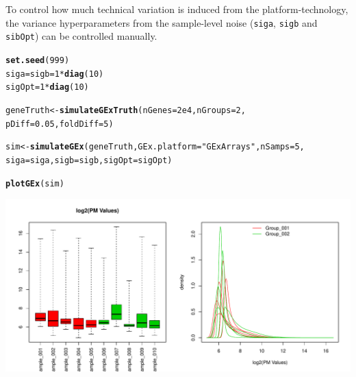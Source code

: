\documentclass{article}\usepackage[]{graphicx}\usepackage[usenames,dvipsnames]{color}
\makeatletter
\def\maxwidth{ %
  \ifdim\Gin@nat@width>\linewidth
    \linewidth
  \else
    \Gin@nat@width
  \fi
}
\newcommand{\hlnum}[1]{\textcolor[rgb]{0.686,0.059,0.569}{#1}}%
\newcommand{\hlstr}[1]{\textcolor[rgb]{0.192,0.494,0.8}{#1}}%
\newcommand{\hlopt}[1]{\textcolor[rgb]{0,0,0}{#1}}%
\newcommand{\hlstd}[1]{\textcolor[rgb]{0.345,0.345,0.345}{#1}}%
\newcommand{\hlkwb}[1]{\textcolor[rgb]{0.69,0.353,0.396}{#1}}%
\newcommand{\hlkwc}[1]{\textcolor[rgb]{0.333,0.667,0.333}{#1}}%
\newcommand{\hlkwd}[1]{\textcolor[rgb]{0.737,0.353,0.396}{\textbf{#1}}}%
\newenvironment{kframe}{%
 \def\at@end@of@kframe{}%
 \ifinner\ifhmode%
  \def\at@end@of@kframe{\end{minipage}}%
  \begin{minipage}{\columnwidth}%
 \fi\fi%
 \def\FrameCommand##1{\hskip\@totalleftmargin \hskip-\fboxsep
 \colorbox{shadecolor}{##1}\hskip-\fboxsep
     \hskip-\linewidth \hskip-\@totalleftmargin \hskip\columnwidth}%
 \MakeFramed {\advance\hsize-\width
   \@totalleftmargin\z@ \linewidth\hsize
   \@setminipage}}%
 {\par\unskip\endMakeFramed%
 \at@end@of@kframe}
\newenvironment{knitrout}{}{} %
\makeatother
\begin{document}
To control how much technical variation is induced from the 
platform-technology, the variance hyperparameters from the sample-level 
noise (\texttt{siga}, \texttt{sigb} and \texttt{sibOpt}) can be 
controlled manually.
\begin{knitrout}
\color{fgcolor}\begin{kframe}
\begin{alltt}
\hlkwd{set.seed}\hlstd{(}\hlnum{999}\hlstd{)}
\hlstd{siga} \hlkwb{=} \hlstd{sigb} \hlkwb{=} \hlnum{1} \hlopt{*} \hlkwd{diag}\hlstd{(}\hlnum{10}\hlstd{)}
\hlstd{sigOpt} \hlkwb{=} \hlnum{1} \hlopt{*} \hlkwd{diag}\hlstd{(}\hlnum{10}\hlstd{)}

\hlstd{geneTruth} \hlkwb{<-} \hlkwd{simulateGExTruth}\hlstd{(}\hlkwc{nGenes} \hlstd{=} \hlnum{2e4}\hlstd{,} \hlkwc{nGroups} \hlstd{=} \hlnum{2}\hlstd{,}
                              \hlkwc{pDiff} \hlstd{=} \hlnum{0.05}\hlstd{,} \hlkwc{foldDiff} \hlstd{=} \hlnum{5}\hlstd{)}
\end{alltt}


{\ttfamily\noindent\itshape\color{messagecolor}{\#\# [quantroSim]: Simulating RNA transcript counts using a Poisson \\\#\#\ \ \ \ \ \ \ \ \ \  distribution with mean parameters from 0.01 to 4662.66}}\begin{alltt}
\hlstd{sim} \hlkwb{<-} \hlkwd{simulateGEx}\hlstd{(geneTruth,}  \hlkwc{GEx.platform} \hlstd{=} \hlstr{"GExArrays"}\hlstd{,} \hlkwc{nSamps} \hlstd{=} \hlnum{5}\hlstd{,}
                   \hlkwc{siga} \hlstd{= siga,} \hlkwc{sigb} \hlstd{= sigb,} \hlkwc{sigOpt} \hlstd{= sigOpt)}
\end{alltt}


{\ttfamily\noindent\itshape\color{messagecolor}{\#\# Simulating gene expression samples using the GEx.platform: GExArrays\\\#\# No PCR amplification of RNA transcript counts.}}\begin{alltt}
\hlkwd{plotGEx}\hlstd{(sim)}
\end{alltt}
\end{kframe}
\includegraphics[width=\maxwidth]{figure/simGene-figs3-1} 

\end{knitrout}
\end{document}
